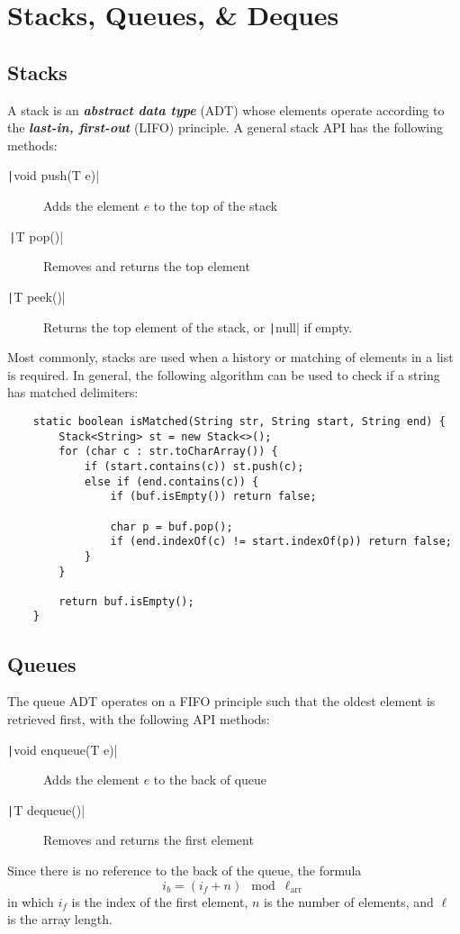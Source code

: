 \documentclass[12pt, letterpaper]{article}
\begin{document}
\newpage
\section{Stacks, Queues, \& Deques}
\subsection{Stacks }
A stack is an \textbf{\textit{abstract data type}} (ADT) whose elements operate according to the \textbf{\textit{last-in, first-out}} (LIFO) principle. A general stack API has the following methods:
\begin{description}
    \item[\texttt|void push(T e)|] Adds the element $e$ to the top of the stack
    \item[\qquad\quad\;\,\texttt|T pop()|] Removes and returns the top element
    \item[\qquad\quad\texttt|T peek()|] Returns the top element of the stack, or \texttt|null| if empty.
\end{description}
Most commonly, stacks are used when a history or matching of elements in a list is required. In general, the following algorithm can be used to check if a string has matched delimiters:
\begin{verbatim}
    static boolean isMatched(String str, String start, String end) {
        Stack<String> st = new Stack<>();
        for (char c : str.toCharArray()) {
            if (start.contains(c)) st.push(c);
            else if (end.contains(c)) {
                if (buf.isEmpty()) return false;

                char p = buf.pop();
                if (end.indexOf(c) != start.indexOf(p)) return false;
            }
        }

        return buf.isEmpty();
    }
\end{verbatim}

\subsection{Queues }
The queue ADT operates on a FIFO principle such that the oldest element is retrieved first, with the following API methods:
\begin{description}
    \item[\texttt|void enqueue(T e)|] Adds the element $e$ to the back of queue
    \item[\quad\quad\;\;\;\texttt|T dequeue()|] Removes and returns the first element
\end{description}
Since there is no reference to the back of the queue, the formula
\begin{equation}
    i_b = (i_f + n) \mod \ell_{\text{arr}}
\end{equation}
in which $i_f$ is the index of the first element, $n$ is the number of elements, and $\ell$ is the array length.
\end{document}
